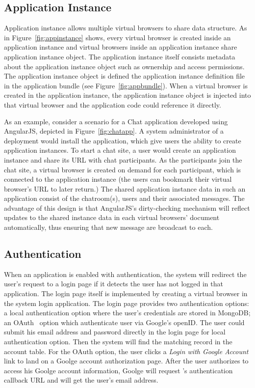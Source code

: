 \subsection{Application Instance}
\label{sec:appins}
\appinstancefig{}


Application instance allows multiple virtual browsers to share data structure.
As in Figure~\ref{fig:appinstance} shows, 
every virtual browser is created inside an application instance
and virtual browsers inside an application instance share application instance object.
The application instance itself
consists metadata about the application instance object
 such as ownership and access permissions.
The application instance object is defined
the application instance definition file 
in the application bundle (see Figure~\ref{fig:appbundle}).
When a virtual browser is created in the application instance,
the application instance object is injected into that virtual browser
and the application code could reference it directly.

\chatappfig{}

As an example, consider a scenario for a Chat application developed using AngularJS,
depicted in Figure~\ref{fig:chatapp}.
A system administrator of a \cb deployment would install the application, which give users the
ability to create application instances. To start a chat site, a user would create
an application instance and share its URL with chat participants.  As the participants join
the chat site, a virtual browser is created on demand for each participant, which is connected
to the application instance (the users can bookmark their virtual browser's URL to later return.)
The shared application instance data in such an application
consist of the chatroom(s), users and their associated messages.  The advantage of this design
is that AngularJS's dirty-checking mechanism will reflect updates to the shared instance data
in each virtual browsers' document automatically, thus ensuring that new message are broadcast
to each.

\subsection{Authentication}

When an application is enabled with authentication, the system will redirect
the user's request to a login page if it detects the user has not logged in
that application. The login page itself is implemented by creating a virtual
browser in the system login application. The login page provides two
authentication options: a local authentication option where the user's
credentials are stored in MongoDB; an OAuth~\cite{hardt2012oauth} option which
authenticate user via Google's openID. The user could submit his email address
and password directly in the login page  for local authentication option. Then
the system will find the matching record in the account table.   For the OAuth
option, the user clicks a \emph{Login with Google Account} link  to land on a
Goolge account authorization page. After the user authorizes \cb{} to access
his Goolge account information, Goolge will request \cb{}'s authentication
callback URL and \cb{} will get the user's email address.


